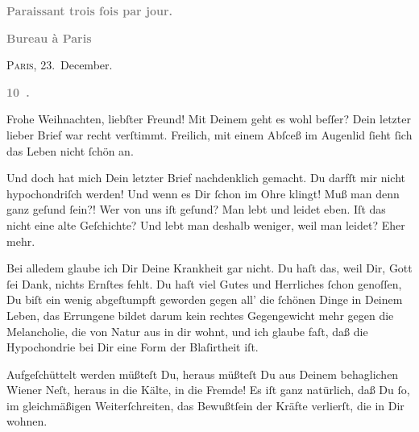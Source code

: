 \pstart
           \begin{otherlanguage}{french}\textcolor{gray}{\textbf{\textbf{Paraissant trois fois par jour.}}}\end{otherlanguage}\pend
           
\pstart
           \begin{otherlanguage}{french}\textcolor{gray}{\textbf{\textbf{Bureau à Paris}}}\end{otherlanguage}\hfill \textsc{Paris}, 23. December.\pend
           
\pstart
           \begin{otherlanguage}{french}\textcolor{gray}{\textbf{\textbf{10 .}}}\end{otherlanguage}\pend
           
\pstart{}Frohe Weihnachten, liebſter Freund!\pend\vspace{0.5em}
\pstart
           Mit Deinem \label{K_L02834-1v}\label{K_L02834-1}
               geht es wohl beſſer? Dein letzter lieber Brief war recht verſtimmt. Freilich, mit
               einem Abſceß im Augenlid{ }ſieht{ }ſich das Leben nicht{ }ſchön an.\pend
           
\pstart
           Und doch hat mich Dein letzter Brief nachdenklich gemacht. Du darfſt mir nicht
               hypochondriſch werden! Und wenn es Dir{ }ſchon im Ohre klingt! Muß man denn ganz geſund{ }ſein?! Wer von uns iſt geſund? Man lebt und leidet eben. Iſt das nicht eine alte
               Geſchichte? Und lebt man deshalb weniger, weil man leidet? Eher mehr.\pend
           
\pstart
           {\pb}Bei alledem glaube ich Dir Deine Krankheit gar
               nicht. Du haſt das, weil Dir, Gott{ }ſei Dank, nichts Ernſtes fehlt. Du haſt viel Gutes
               und Herrliches{ }ſchon genoſſen, Du biſt ein wenig abgeſtumpft geworden gegen all’ die{ }ſchönen Dinge in Deinem Leben, das Errungene bildet darum kein rechtes Gegengewicht
               mehr gegen die Melancholie, die von Natur aus in dir wohnt, und ich glaube faſt, daß
               die Hypochondrie bei Dir eine Form der Blaſirtheit iſt.\pend
           
\pstart
           Aufgeſchüttelt werden müßteſt Du, heraus müßteſt Du aus Deinem behaglichen Wiener Neſt, heraus in die Kälte, in die Fremde! Es
               iſt ganz natürlich, daß Du{ }ſo, im gleichmäßigen {\pb}Weiterſchreiten, das Bewußtſein der Kräfte verlierſt, die in Dir wohnen.\pend
           
